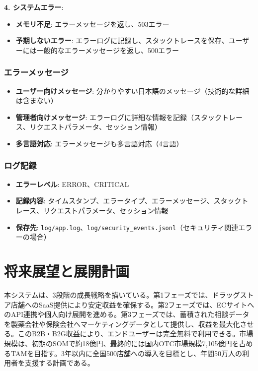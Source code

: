 \documentclass[a4paper,11pt,ja=standard,xelatex]{bxjsarticle}
\theoremstyle{definition}
\begin{document}
\textbf{4. システムエラー}:
\begin{itemize}
\item \textbf{メモリ不足}: エラーメッセージを返し、503エラー
\item \textbf{予期しないエラー}: エラーログに記録し、スタックトレースを保存、ユーザーには一般的なエラーメッセージを返し、500エラー
\end{itemize}

\subsubsection{エラーメッセージ}

\begin{itemize}
\item \textbf{ユーザー向けメッセージ}: 分かりやすい日本語のメッセージ（技術的な詳細は含まない）
\item \textbf{管理者向けメッセージ}: エラーログに詳細な情報を記録（スタックトレース、リクエストパラメータ、セッション情報）
\item \textbf{多言語対応}: エラーメッセージも多言語対応（4言語）
\end{itemize}

\subsubsection{ログ記録}

\begin{itemize}
\item \textbf{エラーレベル}: ERROR、CRITICAL
\item \textbf{記録内容}: タイムスタンプ、エラータイプ、エラーメッセージ、スタックトレース、リクエストパラメータ、セッション情報
\item \textbf{保存先}: \texttt{log/app.log}、\texttt{log/security\_events.jsonl}（セキュリティ関連エラーの場合）
\end{itemize}

\section{将来展望と展開計画}

本システムは、3段階の成長戦略を描いている。第1フェーズでは、ドラッグストア店舗へのSaaS提供により安定収益を確保する。第2フェーズでは、ECサイトへのAPI連携や個人向け展開を進める。第3フェーズでは、蓄積された相談データを製薬会社や保険会社へマーケティングデータとして提供し、収益を最大化させる。このB2B・B2G収益により、エンドユーザーは完全無料で利用できる。市場規模は、初期のSOMで約18億円、最終的には国内OTC市場規模7,105億円を占めるTAMを目指す。3年以内に全国500店舗への導入を目標とし、年間50万人の利用者を支援する計画である。
\end{document}
